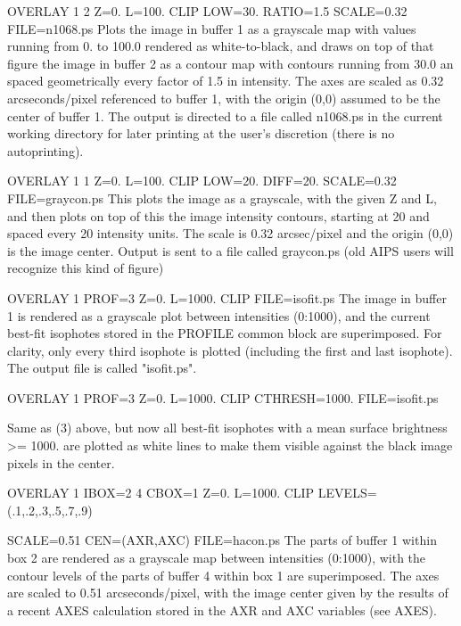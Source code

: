 \begin{example}
  \item[OVERLAY 1 2 Z=0. L=100. CLIP LOW=30. RATIO=1.5 SCALE=0.32 FILE=n1068.ps\hfill]{
   Plots the image in buffer 1 as a grayscale map with values running from
   0. to 100.0 rendered as white-to-black, and draws on top of that figure
   the image in buffer 2 as a contour map with contours running from 30.0
   an spaced geometrically every factor of 1.5 in intensity.  The axes
   are scaled as 0.32 arcseconds/pixel referenced to buffer 1, with the
   origin (0,0) assumed to be the center of buffer 1.  The output is
   directed to a file called n1068.ps in the current working directory
   for later printing at the user's discretion (there is no autoprinting).}
  \item[OVERLAY 1 1 Z=0. L=100. CLIP LOW=20. DIFF=20. SCALE=0.32 FILE=graycon.ps\hfill]{
   This plots the image as a grayscale, with the given Z and L, and then
   plots on top of this the image intensity contours, starting at 20 and
   spaced every 20 intensity units.  The scale is 0.32 arcsec/pixel and
   the origin (0,0) is the image center.  Output is sent to a file
   called graycon.ps  (old AIPS users will recognize this kind of figure)}
  \item[OVERLAY 1 PROF=3 Z=0. L=1000. CLIP FILE=isofit.ps\hfill]{
   The image in buffer 1 is rendered as a grayscale plot between
   intensities (0:1000), and the current best-fit isophotes stored in
   the PROFILE common block are superimposed.  For clarity, only every 
   third isophote is  plotted (including the first and last isophote).
   The output file is called "isofit.ps".}
  \item[OVERLAY 1 PROF=3 Z=0. L=1000. CLIP CTHRESH=1000. FILE=isofit.ps\hfill]{}
  \item[\hfill]{Same as (3) above, but now all best-fit isophotes with a mean
   surface brightness >= 1000. are plotted as white lines to make
   them visible against the black image pixels in the center.}
  \item[OVERLAY 1 IBOX=2 4 CBOX=1 Z=0. L=1000. 
        CLIP LEVELS=(.1,.2,.3,.5,.7,.9)\hfill]{}
  \item[SCALE=0.51 CEN=(AXR,AXC) FILE=hacon.ps\hfill]{
   The parts of buffer 1 within box 2 are rendered as a grayscale map
   between intensities (0:1000), with the contour levels of the parts
   of buffer 4 within box 1 are superimposed.  The axes are scaled to 0.51
   arcseconds/pixel, with the image center given by the results of a recent
   AXES calculation stored in the AXR and AXC variables (see AXES).}

\end{example}
